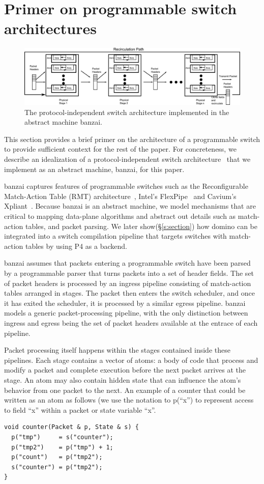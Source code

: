 \section{Primer on programmable switch architectures}
\label{s:architecture}

\begin{figure}[t]
\includegraphics[width=\textwidth]{p4_switch_model.pdf}
\caption{The protocol-independent switch architecture implemented in the
abstract machine banzai.}
\label{fig:architecture}
\end{figure}

This section provides a brief primer on the architecture of a programmable
switch to provide sufficient context for the rest of the paper. For
concreteness, we describe an idealization of a protocol-independent switch
architecture~\cite{pisa} that we implement as an abstract machine, banzai, for
this paper.

banzai captures features of programmable switches such as the Reconfigurable
Match-Action Table (RMT) architecture~\cite{rmt}, Intel's
FlexPipe~\cite{flexpipe} and Cavium's Xpliant~\cite{xpliant}. Because banzai is
an abstract machine, we model mechanisms that are critical to mapping
data-plane algorithms and abstract out details such as match-action tables, and
packet parsing. We later show(\S\ref{s:section}) how domino can be integrated
into a switch compilation pipeline that targets switches with match-action tables
by using P4 as a backend.

banzai assumes that packets entering a programmable switch have been  parsed by
a programmable parser that turns packets into a set of header fields. The set
of packet headers is processed by an ingress pipeline consisting of
match-action tables arranged in stages. The packet then enters the switch
scheduler, and once it has exited the scheduler, it is processed by a similar
egress pipeline. banzai models a generic packet-processing pipeline, with the
only distinction between ingress and egress being the set of packet headers
available at the entrace of each pipeline.

Packet processing itself happens within the stages contained inside these
pipelines. Each stage contains a vector of atoms: a body of code that process
and modify a packet and complete execution before the next packet arrives at
the stage.  An atom may also contain hidden state that can influence the atom's
behavior from one packet to the next. An example of a counter that could be
written as an atom as follows (we use the notation to p(``x'') to represent access
to field ``x'' within a packet or state variable ``x''.
\begin{verbatim}
void counter(Packet & p, State & s) {
  p("tmp")     = s("counter");
  p("tmp2")    = p("tmp") + 1;
  p("count")   = p("tmp2");
  s("counter") = p("tmp2");
}
\end{verbatim}

